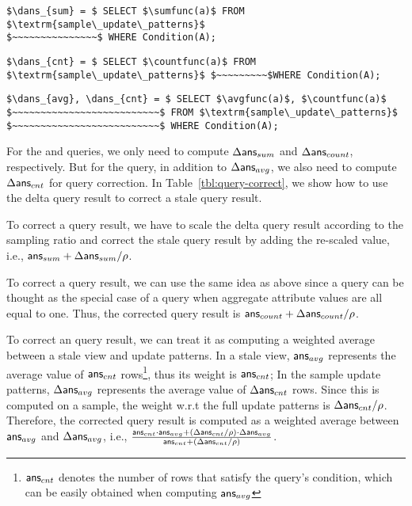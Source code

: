 \begin{lstlisting}[mathescape,basicstyle={\scriptsize}]
$\dans_{sum} = $ SELECT $\sumfunc(a)$ FROM $\textrm{sample\_update\_patterns}$ 
$~~~~~~~~~~~~~~~$ WHERE Condition(A);
\end{lstlisting}

\vspace{-.25em}

\begin{lstlisting}[mathescape,basicstyle={\scriptsize}]
$\dans_{cnt} = $ SELECT $\countfunc(a)$ FROM $\textrm{sample\_update\_patterns}$ $~~~~~~~~~$WHERE Condition(A);
\end{lstlisting}

\vspace{-.25em}

\begin{lstlisting}[mathescape,basicstyle={\scriptsize}]
$\dans_{avg}, \dans_{cnt} = $ SELECT $\avgfunc(a)$, $\countfunc(a)$ 
$~~~~~~~~~~~~~~~~~~~~~~~~~~$ FROM $\textrm{sample\_update\_patterns}$
$~~~~~~~~~~~~~~~~~~~~~~~~~~$ WHERE Condition(A);
\end{lstlisting}

\vspace{-.25em}

For the \sumfunc and \countfunc queries, we only need to compute $\Delta\textsf{ans}_{sum}$ and $\Delta\textsf{ans}_{count}$, respectively. But for the \avgfunc query, in addition to $\Delta\textsf{ans}_{avg}$, we also need to compute $\Delta\textsf{ans}_{cnt}$ for query correction.
In Table~\ref{tbl:query-correct}, we show how to use the delta query result to correct a stale query result. 


To correct a \sumfunc query result, we have to scale the delta query result according to the sampling ratio and correct the stale query result by adding the re-scaled value, i.e., $\textsf{ans}_{sum}+\Delta\textsf{ans}_{sum}/\rho $. 

To correct a \countfunc query result, we can use the same idea as above since a \countfunc query can be thought as the special case of a \sumfunc query when aggregate attribute values are all equal to one. Thus, the corrected \countfunc query result is $\textsf{ans}_{count}+\Delta\textsf{ans}_{count}/\rho $.

To correct an \avgfunc query result, we can treat it as computing a weighted average between a stale view and update patterns. In a stale view, $\textsf{ans}_{avg}$ represents the average value of $\textsf{ans}_{cnt}$ rows\footnote{\small $\textsf{ans}_{cnt}$ denotes the number of rows that satisfy the \avgfunc query's condition, which can be easily obtained when computing $\textsf{ans}_{avg}$}, thus its weight is $\textsf{ans}_{cnt}$; In the sample update patterns, $\Delta\textsf{ans}_{avg}$ represents the average value of $\Delta\textsf{ans}_{cnt}$ rows. Since this is computed on a sample, the weight w.r.t the full update patterns is  $\Delta\textsf{ans}_{cnt}/\rho $. Therefore, the corrected \avgfunc query result is computed as a weighted average between $\textsf{ans}_{avg}$ and $\Delta\textsf{ans}_{avg}$, i.e., $\frac{\textsf{ans}_{cnt}\cdot\textsf{ans}_{avg}+(\Delta\textsf{ans}_{cnt}/\rho )\cdot\Delta\textsf{ans}_{avg}}{\textsf{ans}_{cnt}+(\Delta\textsf{ans}_{cnt}/\rho )}$.


